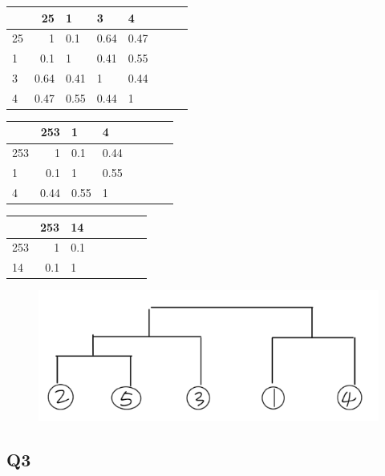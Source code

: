 \documentclass[11pt]{article}
\makeatletter
\def\maxwidth{\ifdim\Gin@nat@width>\linewidth\linewidth
    \else\Gin@nat@width\fi}
\let\Oldincludegraphics\includegraphics
\renewcommand{\includegraphics}[1]{\Oldincludegraphics[width=.8\maxwidth]{#1}}
\makeatother
\begin{document}
\begin{table}[H]
	\centering
	\begin{tabular}{|l|r|l|l|l|l|l|r|}
		\toprule
		{} &  25 &1 &      3 & 4 \\
		\midrule
		25 &  1 & 0.1 &    0.64 & 0.47  \\
		1 &  0.1 &   1 & 0.41 &  0.55 \\
		3 &  0.64 & 0.41 &   1 &  0.44 \\
		4 & 0.47 &   0.55 & 0.44 &  1 \\
		\bottomrule
	\end{tabular}
\end{table}


\begin{table}[H]
	\centering
	\begin{tabular}{|l|r|l|l|l|l|l|r|}
		\toprule
		{} &  253 & 1 & 4 \\
		\midrule
		253 &  1 & 0.1 &    0.44 \\
		1 &  0.1 & 1 &   0.55 \\
		4 & 0.44 &  0.55 & 1\\
		\bottomrule
	\end{tabular}
\end{table}


\begin{table}[H]
	\centering
	\begin{tabular}{|l|r|l|l|l|l|l|r|}
		\toprule
		{} &  253&  14 \\
		\midrule
		253 &  1 & 0.1  \\
		14 &  0.1 & 1 \\
		\bottomrule
	\end{tabular}
\end{table}


\begin{figure}[H]
	\centering
	\includegraphics{5.png}
	\caption{}
\end{figure}


    \subsection*{Q3}\label{q3}
\end{document}
